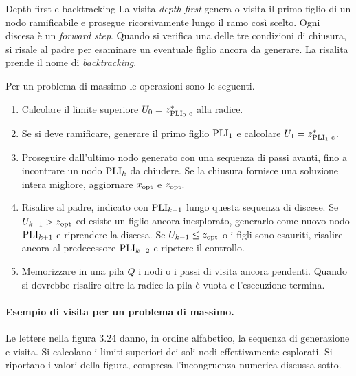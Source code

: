 \begin{definition}{Depth first e backtracking}
La visita \emph{depth first} genera o visita il primo figlio di un nodo
ramificabile e prosegue ricorsivamente lungo il ramo così scelto. Ogni
discesa è un \emph{forward step}. Quando si verifica una delle tre
condizioni di chiusura, si risale al padre per esaminare un eventuale
figlio ancora da generare. La risalita prende il nome di \emph{backtracking}.
\end{definition}

Per un problema di massimo le operazioni sono le seguenti.
\begin{enumerate}
 \item Calcolare il limite superiore $U_0=z^*_{\mathrm{PLI}_{0}\text{-c}}$ alla radice.
 \item Se si deve ramificare, generare il primo figlio $\mathrm{PLI}_{1}$ e
       calcolare $U_1=z^*_{\mathrm{PLI}_{1}\text{-c}}$.
 \item Proseguire dall'ultimo nodo generato con una sequenza di passi
       avanti, fino a incontrare un nodo $\mathrm{PLI}_{k}$ da chiudere.
       Se la chiusura fornisce una soluzione intera migliore,
       aggiornare $x_{\mathrm{opt}}$ e $z_{\mathrm{opt}}$.
 \item Risalire al padre, indicato con $\mathrm{PLI}_{k-1}$ lungo questa
       sequenza di discese. Se $U_{k-1}>z_{\mathrm{opt}}$ ed esiste un figlio
       ancora inesplorato, generarlo come nuovo nodo $\mathrm{PLI}_{k+1}$ e
       riprendere la discesa. Se $U_{k-1}\leq z_{\mathrm{opt}}$ o i figli sono
       esauriti, risalire ancora al predecessore $\mathrm{PLI}_{k-2}$ e
       ripetere il controllo.
 \item Memorizzare in una pila $Q$ i nodi o i passi di visita ancora
       pendenti. Quando si dovrebbe risalire oltre la radice la pila è
       vuota e l'esecuzione termina.
\end{enumerate}

\paragraph{Esempio di visita per un problema di massimo.}
Le lettere nella figura 3.24 danno, in ordine alfabetico, la sequenza
di generazione e visita. Si calcolano i limiti superiori dei soli nodi
effettivamente esplorati. Si riportano i valori della figura, compresa
l'incongruenza numerica discussa sotto.

